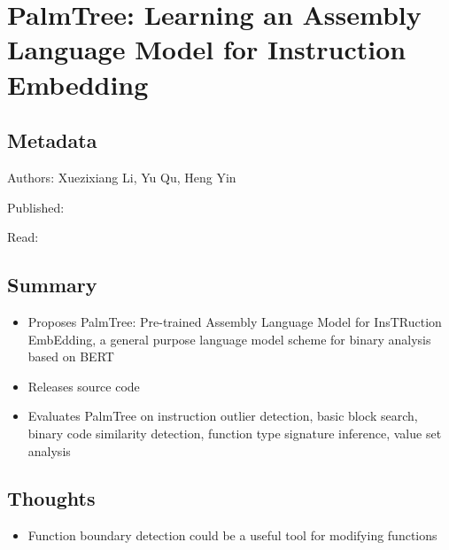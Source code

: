\documentclass{article}
\begin{document}
\section*{PalmTree: Learning an Assembly Language Model for Instruction Embedding}

\subsection*{Metadata}

\noindent Authors: Xuezixiang Li, Yu Qu, Heng Yin

\noindent Published: 

\noindent Read: 

\subsection*{Summary}
\begin{itemize}
	\item Proposes PalmTree: Pre-trained Assembly Language Model for InsTRuction EmbEdding, a general purpose language model scheme for binary analysis based on BERT
	\item Releases source code
	\item Evaluates PalmTree on instruction outlier detection, basic block search, binary code similarity detection, function type signature inference, value set analysis
\end{itemize}

\subsection*{Thoughts}
\begin{itemize}
	\item Function boundary detection could be a useful tool for modifying functions
\end{itemize}
\end{document}
